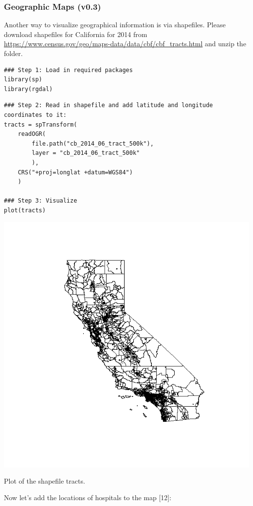 \begin{frame}
\frametitle{Geographic Maps (v0.3)}

Another way to visualize geographical information is via shapefiles. Please download shapefiles for California for 2014 from \url{https://www.census.gov/geo/maps-data/data/cbf/cbf_tracts.html} and unzip the folder.

\begin{lstlisting}
### Step 1: Load in required packages
library(sp)
library(rgdal)
\end{lstlisting}

\newpage
\begin{lstlisting}
### Step 2: Read in shapefile and add latitude and longitude coordinates to it:
tracts = spTransform(
	readOGR(
		file.path("cb_2014_06_tract_500k"), 
		layer = "cb_2014_06_tract_500k"
		), 
	CRS("+proj=longlat +datum=WGS84")
	) 

### Step 3: Visualize
plot(tracts)
\end{lstlisting}

\newpage
       \begin{center}
		\includegraphics[scale=0.25]{images/shapefile_v0.png}
		\caption{Plot of the shapefile tracts.}
	\end{center}

\newpage
Now let's add the locations of hospitals to the map [12]:


\end{frame}
